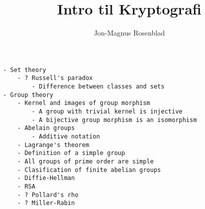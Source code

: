 \documentclass[norks, draft]{article}
\author{Jon-Magnus Rosenblad}
\title{Intro til Kryptografi}
\begin{document}
\maketitle

\tableofcontents
\listoftodos

%








\begin{verbatim}
- Set theory
    - ? Russell's paradox
        - Difference between classes and sets
- Group theory
    - Kernel and images of group morphism
        - A group with trivial kernel is injective
        - A bijective group morphism is an isomorphism
    - Abelain groups
        - Additive notation
    - Lagrange's theorem
    - Definition of a simple group
    - All groups of prime order are simple
    - Clasification of finite abelian groups
    - Diffie-Hellman
    - RSA
    - ? Pollard's rho
    - ? Miller-Rabin
\end{verbatim}


\printbibliography
\end{document}
